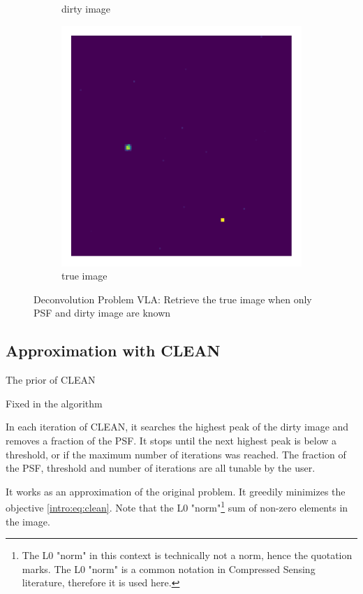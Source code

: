 \begin{figure}[h!]
\begin{subfigure}[b]{0.28\linewidth}
		\caption{dirty image}
	\end{subfigure}
	\begin{subfigure}[b]{0.28\linewidth}
		\includegraphics[width=\linewidth, trim={18px 19px 18px 18px}, clip]{./chapters/01.intro/img/true_image.png}
		\caption{true image}
	\end{subfigure}
	\caption{Deconvolution Problem VLA: Retrieve the true image when only PSF and dirty image are known}
	\label{intro:measurement_problem}
\end{figure}

\subsection{Approximation with CLEAN}
The prior of CLEAN

Fixed in the algorithm

In each iteration of CLEAN, it searches the highest peak of the dirty image and removes a fraction of the PSF. It stops until the next highest peak is below a threshold, or if the maximum number of iterations was reached. The fraction of the PSF, threshold and number of iterations are all tunable by the user.

It works as an approximation of the original problem. It greedily minimizes the objective \eqref{intro:eq:clean}. 
Note that the L0 "norm"\footnote{The L0 "norm" in this context is technically not a norm, hence the quotation marks. The L0 "norm" is a common notation in Compressed Sensing literature, therefore it is used here.} sum of non-zero elements in the image.

